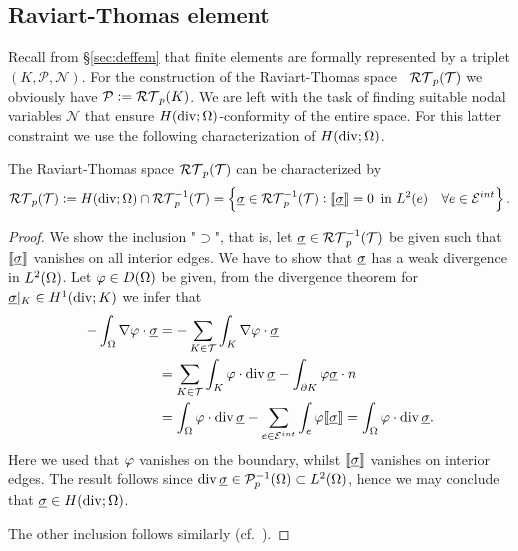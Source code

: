 \documentclass[thesis.tex]{subfiles}
\begin{document}
\subsection{Raviart-Thomas element}
Recall from \S\ref{sec:deffem} that finite elements are formally represented by a triplet $(K, \mathcal{P}, \mathcal{N})$. For
the construction of the Raviart-Thomas space ~$\mathcal{RT}_p( \mathcal{T})$
we obviously have ${\mathcal{P} := \mathcal{RT}_p(K)}$.
We are left with the task of finding suitable nodal variables $\mathcal{N}$ that ensure $H(\operatorname{div};  \Omega)$-conformity of the entire space.
For this latter constraint we use the following characterization of $H(\operatorname{div};  \Omega)$.
\begin{thm}
  \label{thm:rtjump}
  The Raviart-Thomas space $\mathcal{RT}_p( \mathcal{T})$  can be characterized by
  \[
    \mathcal{RT}_p( \mathcal{T}) := H(\operatorname{div};  \Omega) \cap \mathcal{RT}_p^{-1}( \mathcal{T})  = \set{\underline{\sigma}\in \mathcal{RT}_p^{-1}( \mathcal{T}) : \llbracket \underline{\sigma}\rrbracket = 0 \, \text{ in } L^2(e) \quad \forall e \in \mathcal{E}^{int}}.
  \]
\end{thm}
\begin{proof}
  We show the inclusion "$\supset$", that is, let $\underline{\sigma} \in \mathcal{RT}_p^{-1}( \mathcal{T})$ be given such that $\llbracket \underline{\sigma} \rrbracket$
  vanishes on all interior edges. We have to show that $\underline{\sigma}$ has a weak divergence in $L^2( \Omega)$.
  Let $\varphi \in D( \Omega)$ be given, from the divergence theorem for $\underline{\sigma}|_K \in H^1(\operatorname{div}; K)$ we infer that
  \begin{align*}
    - \int_{ \Omega}  \nabla \varphi \cdot \underline{\sigma} &= - \sum_{K \in  \mathcal{T}} \int_K \nabla \varphi \cdot \underline{\sigma} \\
    &=  \sum_{K \in  \mathcal{T}} \int_K \varphi \cdot \operatorname{div} \underline{\sigma} - \int_{\partial K} \varphi \underline{\sigma} \cdot n\\
    &=  \int_{ \Omega} \varphi \cdot \operatorname{div} \underline{\sigma} - \sum_{e \in  \mathcal{E}^{int}} \int_e \varphi \llbracket \underline{\sigma} \rrbracket = \int_{ \Omega} \varphi \cdot \operatorname{div} \underline{\sigma}.
  \end{align*}
  Here we used that $\varphi$ vanishes on the boundary, whilst $\llbracket \underline{\sigma} \rrbracket$ vanishes on interior edges.
  The result follows since $\operatorname{div} \underline{\sigma} \in \mathcal{P}_p^{-1}(\Omega) \subset  L^2( \Omega)$, hence we may conclude that $\underline{\sigma} \in H(\operatorname{div};  \Omega)$.

  The other inclusion follows similarly (cf.~\cite[Thm~3.2]{gaticasimple}).
\end{proof}
\end{document}
